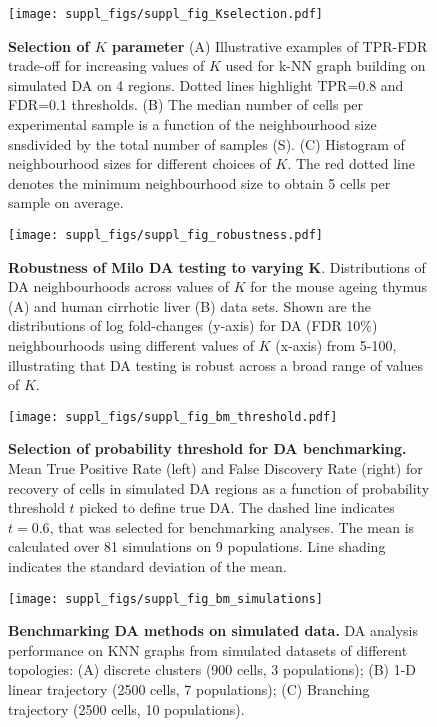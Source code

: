 \documentclass[
]{article}
\begin{document}
\begin{figure}
\centering
\texttt{[image: suppl\_figs/suppl\_fig\_Kselection.pdf]}
\caption{\label{fig:sup-fig-Kselection}\textbf{Selection of \(K\) parameter}
(A) Illustrative examples of TPR-FDR trade-off for increasing values of \(K\) used for k-NN graph building on simulated DA on 4 regions. Dotted lines highlight TPR=0.8 and FDR=0.1 thresholds.
(B) The median number of cells per experimental sample is a function of the neighbourhood size snsdivided by the total number of samples (S). (C) Histogram of neighbourhood sizes for different choices of \(K\). The red dotted line denotes the minimum neighbourhood size to obtain 5 cells per sample on average.}
\end{figure}





\begin{figure}
\centering
\texttt{[image: suppl\_figs/suppl\_fig\_robustness.pdf]}
\caption{\label{fig:sup-fig-robustness}\textbf{Robustness of Milo DA testing to varying K}. Distributions of DA neighbourhoods across values of \(K\) for the mouse ageing thymus (A) and human cirrhotic liver (B) data sets. Shown are the distributions of log fold-changes (y-axis) for DA (FDR 10\%) neighbourhoods using different values of \(K\) (x-axis) from 5-100, illustrating that DA testing is robust across a broad range of values of \(K\).}
\end{figure}



\begin{figure}
\centering
\texttt{[image: suppl\_figs/suppl\_fig\_bm\_threshold.pdf]}
\caption{\label{fig:sup-fig-bm-threshold}\textbf{Selection of probability threshold for DA benchmarking.} Mean True Positive Rate (left) and False Discovery Rate (right) for recovery of cells in simulated DA regions as a function of probability threshold \(t\) picked to define true DA. The dashed line indicates \(t = 0.6\), that was selected for benchmarking analyses. The mean is calculated over 81 simulations on 9 populations. Line shading indicates the standard deviation of the mean.}
\end{figure}



\begin{figure}[ht]
\texttt{[image: suppl\_figs/suppl\_fig\_bm\_simulations]} \caption{\textbf{Benchmarking DA methods on simulated data.} DA analysis performance on KNN graphs from simulated datasets of different topologies: (A) discrete clusters (900 cells, 3 populations); (B) 1-D linear trajectory (2500 cells, 7 populations); (C) Branching trajectory (2500 cells, 10 populations).}\label{fig:sup-fig-bm-simulations}
\end{figure}
\end{document}
